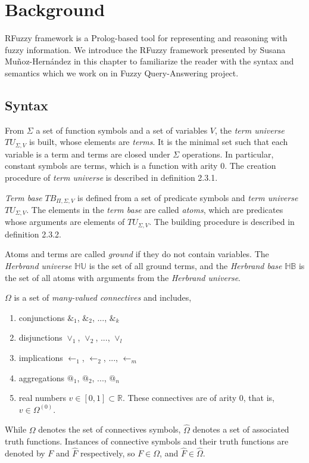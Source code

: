 \documentclass[main.tex]{subfiles}
\begin{document}
\newpage
\section{Background}
\label{sec:Background}
RFuzzy framework is a Prolog-based tool for representing and reasoning with fuzzy information. We introduce the RFuzzy framework presented by Susana Mu\~noz-Hern\'andez \cite{MPS10} in this chapter to familiarize the reader with the syntax and semantics which we work on in Fuzzy Query-Answering project. 

\subsection{Syntax}
\label{sec:FuzzyFrameworkSyntax}
From $\Sigma$ a set of function symbols and a set of variables $V$, the \textit{term universe} $TU_{\Sigma,V}$ is built, whose elements are \textit{terms}. It is the minimal set such that each variable is a term and terms are closed under $\Sigma$ operations. In particular, constant symbols are terms, which is a function with arity $0$. The creation procedure of \textit{term universe} is described in definition 2.3.1.

\textit{Term base} $TB_{\Pi,\Sigma,V}$ is defined from a set of predicate symbols and \textit{term universe} $TU_{\Sigma,V}$. The elements in the \textit{term base} are called \textit{atoms}, which are predicates whose arguments are elements of $TU_{\Sigma,V}$. The building procedure is described in definition 2.3.2.

Atoms and terms are called \textit{ground} if they do not contain variables. The \textit{Herbrand universe} $\mathbb{HU}$ is the set of all ground terms, and the \textit{Herbrand base} $\mathbb{HB}$ is the set of all atoms with arguments from the \textit{Herbrand universe}.

$\Omega$ is a set of \textit{many-valued connectives} and includes,
\begin{enumerate}
 \item conjunctions $\&_1$, $\&_2$, ..., $\&_k$ 
 \item disjunctions $\vee_1$, $\vee_2$, ..., $\vee_l$
 \item implications $\leftarrow_1$, $\leftarrow_2$, ..., $\leftarrow_m$ 
 \item aggregations $@_1$, $@_2$, ..., $@_n$
 \item real numbers $v\in[0,1]\subset \mathbb{R}$. These connectives are of arity $0$, that is, $v\in\Omega^{(0)}$.
\end{enumerate}
While $\Omega$ denotes the set of connectives symbols, $\hat{\Omega}$ denotes a set of associated truth functions. Instances of connective symbols and their truth functions are denoted by $F$ and $\hat{F}$ respectively, so $F \in \Omega$, and $\hat{F} \in \hat{\Omega}$. 
\end{document}
